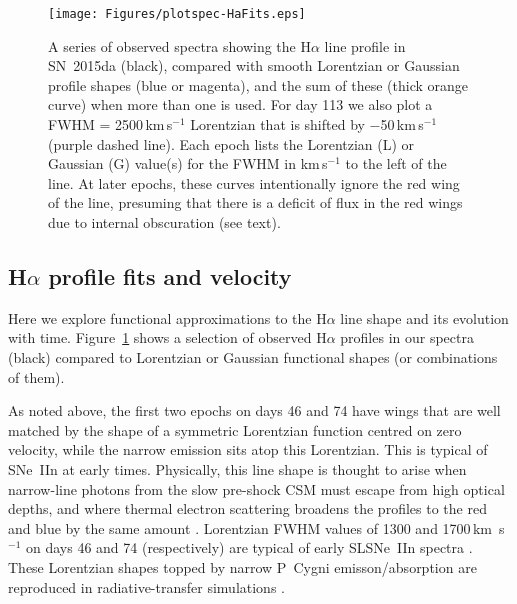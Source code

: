 \documentclass[fleqn,usenatbib,useAMS]{mnras}
\begin{document}
\begin{figure}\begin{center}
\texttt{[image: Figures/plotspec-HaFits.eps]}
\end{center}
\caption{A series of observed spectra showing the H$\alpha$ line
  profile in SN~2015da (black), compared with smooth Lorentzian or
  Gaussian profile shapes (blue or magenta), and the sum of these
  (thick orange curve) when more than one is used.  For day
  113 we also plot a FWHM = 2500\,km\,s$^{-1}$ Lorentzian that is
  shifted by $-$50\,km\,s$^{-1}$ (purple dashed line).  Each epoch lists the
  Lorentzian (L) or Gaussian (G) value(s) for the FWHM in km\,s$^{-1}$ to
  the left of the line.  At later epochs, these curves intentionally
  ignore the red wing of the line, presuming that there is a deficit
  of flux in the red wings due to internal obscuration (see text).}
\label{fig:ha.fits}
\end{figure}


\subsection{H$\alpha$ profile fits and velocity}

Here we explore functional approximations to the H$\alpha$ line shape
and its evolution with time.  Figure~\ref{fig:ha.fits} shows a
selection of observed H$\alpha$ profiles in our spectra (black)
compared to Lorentzian or Gaussian functional shapes (or combinations
of them).

As noted above, the first two epochs on days 46 and 74 have wings that
are well matched by the shape of a symmetric Lorentzian function
centred on zero velocity, while the narrow emission sits atop this
Lorentzian.  This is typical of SNe~IIn at early times.  Physically,
this line shape is thought to arise when narrow-line photons from the
slow pre-shock CSM must escape from high optical depths, and where thermal
electron scattering broadens the profiles to the red and blue by the
same amount \citep{chugai77,smith08tf}.  Lorentzian FWHM values of
1300 and 1700\,km \,s$^{-1}$ on days 46 and 74 (respectively) are typical
of early SLSNe~IIn spectra
\citep{fransson14,smith08tf,smith10,smith20,dickinson23}. These
Lorentzian shapes topped by narrow P~Cygni emisson/absorption are
reproduced in radiative-transfer simulations \citep{dessart15}.
\end{document}
